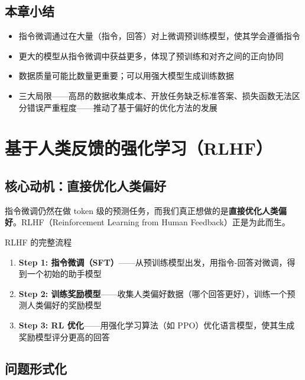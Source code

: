 \documentclass[a4paper]{article}
\begin{document}
\subsection{本章小结}

\begin{itemize}
    \item 指令微调通过在大量（指令，回答）对上微调预训练模型，使其学会遵循指令
    \item 更大的模型从指令微调中获益更多，体现了预训练和对齐之间的正向协同
    \item 数据质量可能比数量更重要；可以用强大模型生成训练数据
    \item 三大局限——高昂的数据收集成本、开放任务缺乏标准答案、损失函数无法区分错误严重程度——推动了基于偏好的优化方法的发展
\end{itemize}


\section{基于人类反馈的强化学习（RLHF）}

\subsection{核心动机：直接优化人类偏好}

指令微调仍然在做 token 级的预测任务，而我们真正想做的是\textbf{直接优化人类偏好}。RLHF（Reinforcement Learning from Human Feedback）正是为此而生。





\begin{importantbox}{RLHF 的完整流程}
\begin{enumerate}
    \item \textbf{Step 1: 指令微调（SFT）}——从预训练模型出发，用指令-回答对微调，得到一个初始的助手模型
    \item \textbf{Step 2: 训练奖励模型}——收集人类偏好数据（哪个回答更好），训练一个预测人类偏好的奖励模型
    \item \textbf{Step 3: RL 优化}——用强化学习算法（如 PPO）优化语言模型，使其生成奖励模型评分更高的回答
\end{enumerate}
\end{importantbox}

\subsection{问题形式化}
\end{document}
